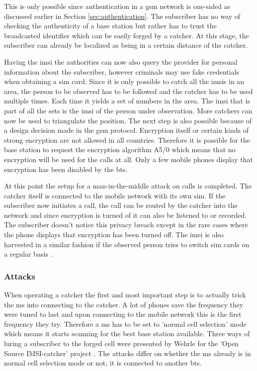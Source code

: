 This is only possible since authentication in a \gls{gsm} network is one-sided as discussed earlier in Section \ref{sec:authentication}.
The subscriber has no way of checking the authenticity of a base station but rather has to trust the broadcasted identifier which can be easily forged by a catcher.
At this stage, the subscriber can already be localized as being in a certain distance of the catcher.

Having the \gls{imsi} the authorities can now also query the provider for personal information about the subscriber, however criminals may use fake credentials when obtaining a \gls{sim} card.
Since it is only possible to catch all the \glspl{imsi} in an area, the person to be observed has to be followed and the catcher has to be used multiple times.
Each time it yields a set of numbers in the area. 
The \gls{imsi} that is part of all the sets is the \gls{imsi} of the person under observation.
More catchers can now be used to triangulate the position.
The next step is also possible because of a design decision made in the \gls{gsm} protocol.
Encryption itself or certain kinds of strong encryption are not allowed in all countries.
Therefore it is possible for the base station to request the encryption algorithm A5/0 which means that no encryption will be used for the calls at all.
Only a few mobile phones display that encryption has been disabled by the \gls{bts}.

At this point the setup for a man-in-the-middle attack \cite{mueller} on calls is completed.
The catcher itself is connected to the mobile network with its own \gls{sim}.
If the subscriber now initiates a call, the call can be routed by the catcher into the network and since encryption is turned of it can also be listened to or recorded.
The subscriber doesn't notice this privacy breach except in the rare cases where the phone displays that encryption has been turned off.
The \gls{imei} is also harvested in a similar fashion if the observed person tries to switch \gls{sim} cards on a regular basis \cite{fox}.

\subsubsection{Attacks}
\label{sec:attacks}
When operating a catcher the first and most important step is to actually trick the \gls{ms} into connecting to the catcher.
A lot of phones save the frequency they were tuned to last and upon connecting to the mobile network this is the first frequency they try.
Therefore a \gls{ms} has to be set to 'normal cell selection' mode which means it starts scanning for the best base station available.
Three ways of luring a subscriber to the forged cell were presented by Wehrle for the 'Open Source IMSI-catcher' project \cite{dennis}.
The attacks differ on whether the \gls{ms} already is in normal cell selection mode or not, \ie it is connected to another \gls{bts}.

